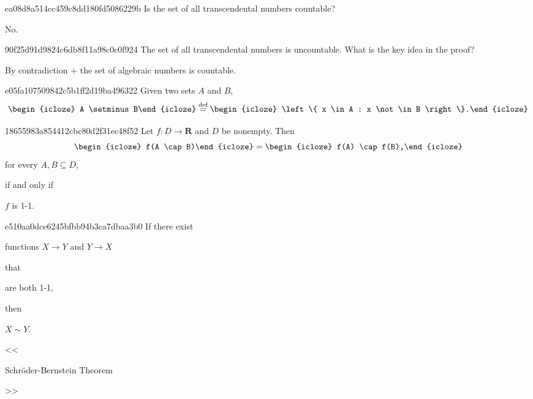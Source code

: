 \begin{note}{ea08d8a514cc459c8dd180fd5086229b}
    Is the set of all transcendental numbers countable?

    \begin{cloze}{1}
        No.
    \end{cloze}
\end{note}

\begin{note}{90f25d91d9824c6db8f11a98c0c0f924}
    The set of all transcendental numbers is uncountable.
    What is the key idea in the proof?

    \begin{cloze}{1}
        By contradiction + the set of algebraic numbers is countable.
    \end{cloze}
\end{note}

\begin{note}{e05fa107509842c5b1ff2d19ba496322}
    Given two sets \({ A }\) and \({ B }\),
    \[
        \begin{icloze}{2}A \setminus B\end{icloze} \overset{\text{def}}= \begin{icloze}{1}\left\{ x \in A : x \not\in B \right\}.\end{icloze}
    \]
\end{note}

\begin{note}{18655983a854412cbc80d2f31ec48f52}
    Let \({ f : D \to \mathbf{R} }\) and \({ D }\) be nonempty.
    Then
    \[
        \begin{icloze}{4}f(A \cap B)\end{icloze} = \begin{icloze}{2}f(A) \cap f(B),\end{icloze}
    \]
    for every \({ A, B \subseteq D }\), \begin{icloze}{3}if and only if\end{icloze} \begin{icloze}{1}\({ f }\) is 1-1.\end{icloze}
\end{note}

\begin{note}{e510aa0dce6245bfbb94b3ca7dbaa3b0}
    If there exist \begin{icloze}{2}functions \({ X \to Y }\) and \({ Y \to X }\)\end{icloze} that \begin{icloze}{1}are both 1-1,\end{icloze} then \begin{icloze}{4}\({ X \sim Y }\).\end{icloze}

    \begin{center}
        \tiny
        <<\begin{icloze}{3}Schröder-Bernstein Theorem\end{icloze}>>
    \end{center}
\end{note}

